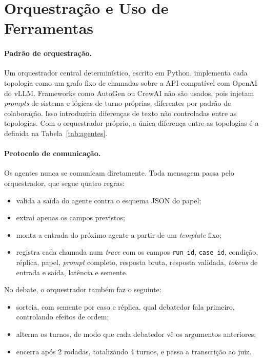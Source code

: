 \documentclass[12pt]{article}
\begin{document}
\section{Orquestração e Uso de Ferramentas}
\label{sec:orquestracao}

\paragraph{Padrão de orquestração.} Um orquestrador central determinístico, escrito em Python, implementa cada topologia como um grafo fixo de chamadas sobre a API compatível com OpenAI do vLLM. Frameworks como AutoGen \citep{wu2023autogen} ou CrewAI não são usados, pois injetam \textit{prompts} de sistema e lógicas de turno próprias, diferentes por padrão de colaboração. Isso introduziria diferenças de texto não controladas entre as topologias. Com o orquestrador próprio, a única diferença entre as topologias é a definida na Tabela~\ref{tab:agentes}.

\paragraph{Protocolo de comunicação.} Os agentes nunca se comunicam diretamente. Toda mensagem passa pelo orquestrador, que segue quatro regras:
\begin{itemize}
    \item valida a saída do agente contra o esquema JSON do papel;
    \item extrai apenas os campos previstos;
    \item monta a entrada do próximo agente a partir de um \textit{template} fixo;
    \item registra cada chamada num \textit{trace} com os campos \texttt{run\_id}, \texttt{case\_id}, condição, réplica, papel, \textit{prompt} completo, resposta bruta, resposta validada, \textit{tokens} de entrada e saída, latência e semente.
\end{itemize}
No debate, o orquestrador também faz o seguinte:
\begin{itemize}
    \item sorteia, com semente por caso e réplica, qual debatedor fala primeiro, controlando efeitos de ordem;
    \item alterna os turnos, de modo que cada debatedor vê os argumentos anteriores;
    \item encerra após 2 rodadas, totalizando 4 turnos, e passa a transcrição ao juiz.
\end{itemize}
\end{document}
